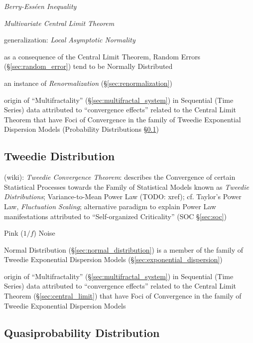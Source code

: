 \emph{Berry-Ess\'een Inequality}

\emph{Multivariate Central Limit Theorem}

generalization: \emph{Local Asymptotic Normality}

as a consequence of the Central Limit Theorem, Random Errors
(\S\ref{sec:random_error}) tend to be Normally Distributed

\fist an instance of \emph{Renormalization} (\S\ref{sec:renormalization})

\fist origin of ``Multifractality'' (\S\ref{sec:multifractal_system}) in
Sequential (Time Series) data attributed to ``convergence effects'' related to
the Central Limit Theorem that have Foci of Convergence in the family of Tweedie
Exponential Dispersion Models (Probability Distributions
\S\ref{sec:tweedie_distribution})



\subsection{Tweedie Distribution}\label{sec:tweedie_distribution}

(wiki): \emph{Tweedie Convergence Theorem}: describes the Convergence of certain
Statistical Processes towards the Family of Statistical Models known as
\emph{Tweedie Distributions}; Variance-to-Mean Power Law (TODO: xref); cf.
Taylor's Power Law, \emph{Fluctuation Scaling}; alternative paradigm to explain
Power Law manifestations attributed to ``Self-organized Criticality''
(SOC \S\ref{sec:soc})

Pink ($1/f$) Noise

Normal Distribution (\S\ref{sec:normal_distribution}) is a member of the family
of Tweedie Exponential Dispersion Models (\S\ref{sec:exponential_dispersion})

\fist origin of ``Multifractality'' (\S\ref{sec:multifractal_system}) in
Sequential (Time Series) data attributed to ``convergence effects'' related to
the Central Limit Theorem (\S\ref{sec:central_limit}) that have Foci of
Convergence in the family of Tweedie Exponential Dispersion Models



\subsection{Quasiprobability Distribution}
\label{sec:quasiprobability_distribution}

